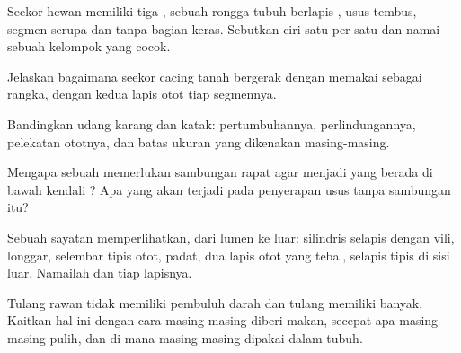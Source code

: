 \begin{exercise}[$\star\star$]\label{exo:b1:body-plans-tissues:5}
Seekor hewan memiliki tiga , sebuah rongga tubuh
berlapis , usus tembus, segmen serupa dan tanpa bagian keras.
Sebutkan ciri  satu per satu dan namai sebuah kelompok yang
cocok.
\end{exercise}

\begin{exercise}[$\star\star$]\label{exo:b1:body-plans-tissues:6}
Jelaskan bagaimana seekor cacing tanah bergerak dengan memakai 
sebagai rangka, dengan kedua lapis otot tiap segmennya.
\end{exercise}

\begin{exercise}[$\star\star$]\label{exo:b1:body-plans-tissues:7}
Bandingkan  udang karang dan  katak:
pertumbuhannya, perlindungannya, pelekatan ototnya, dan batas ukuran
yang dikenakan masing-masing.
\end{exercise}

\begin{exercise}[$\star\star$]\label{exo:b1:body-plans-tissues:8}
Mengapa sebuah  memerlukan sambungan rapat agar menjadi  yang berada di bawah kendali ? Apa yang akan terjadi
pada penyerapan usus tanpa sambungan itu?
\end{exercise}

\begin{exercise}[$\star\star$]\label{exo:b1:body-plans-tissues:9}
Sebuah sayatan memperlihatkan, dari lumen ke luar:  silindris
selapis dengan vili,  longgar, selembar tipis otot,
 padat, dua lapis otot yang tebal, selapis tipis di sisi
luar. Namailah  dan tiap lapisnya.
\end{exercise}

\begin{exercise}[$\star\star\star$]\label{exo:b1:body-plans-tissues:10}
Tulang rawan tidak memiliki pembuluh darah dan tulang memiliki banyak.
Kaitkan hal ini dengan cara masing-masing diberi makan, secepat apa
masing-masing pulih, dan di mana masing-masing dipakai dalam tubuh.
\end{exercise}

